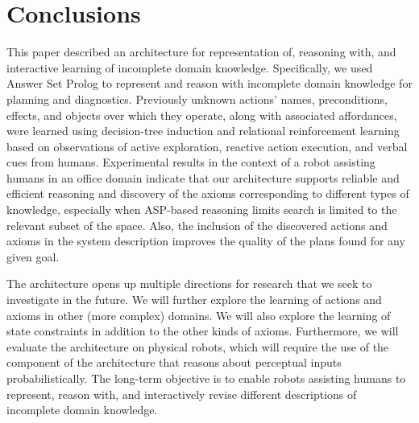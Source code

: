 \documentclass{article}
\begin{document}
\section{Conclusions}
\label{sec:conclusions}
This paper described an architecture for representation of, reasoning
with, and interactive learning of incomplete domain knowledge.
Specifically, we used Answer Set Prolog to represent and reason with
incomplete domain knowledge for planning and diagnostics. Previously
unknown actions' names, preconditions, effects, and objects over which
they operate, along with associated affordances, were learned using
decision-tree induction and relational reinforcement learning based on
observations of active exploration, reactive action execution, and
verbal cues from humans. Experimental results in the context of a
robot assisting humans in an office domain indicate that our
architecture supports reliable and efficient reasoning and discovery
of the axioms corresponding to different types of knowledge,
especially when ASP-based reasoning limits search is limited to the
relevant subset of the space. Also, the inclusion of the discovered
actions and axioms in the system description improves the quality of
the plans found for any given goal.

The architecture opens up multiple directions for research that we
seek to investigate in the future. We will further explore the
learning of actions and axioms in other (more complex) domains. We
will also explore the learning of state constraints in addition to the
other kinds of axioms. Furthermore, we will evaluate the architecture
on physical robots, which will require the use of the component of the
architecture that reasons about perceptual inputs probabilistically.
The long-term objective is to enable robots assisting humans to
represent, reason with, and interactively revise different
descriptions of incomplete domain knowledge.










\end{document}
